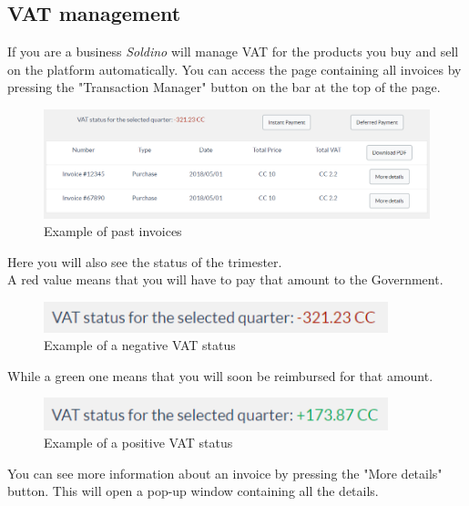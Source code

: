 	\subsection{VAT management}
	If you are a business \textit{Soldino} will manage VAT for the products 
	you buy and sell on the platform automatically. You can access the page 
	containing all invoices by pressing the "Transaction Manager" button 
	on the bar at the top of the page.
	\begin{figure}[H]
		\includegraphics[width=15cm]{res/images/past_invoices.png}
		\centering
		\caption{Example of past invoices}
	\end{figure}
	\noindent Here you will also see the status of the trimester. 
	\\A red value means that you will have to pay that amount to the 
	Government.
	\begin{figure}[H]
		\includegraphics[width=10cm]{res/images/negative_vat_status.png}
		\centering
		\caption{Example of a negative VAT status}
	\end{figure}
	\noindent While a green one means that you will soon be reimbursed for 
	that amount.
	\begin{figure}[H]
		\includegraphics[width=10cm]{res/images/positive_vat_status.png}
		\centering
		\caption{Example of a positive VAT status}
	\end{figure}
	\noindent You can see more information about an invoice by pressing the 
	"More details" button. This will open a pop-up window containing all the 
	details.
